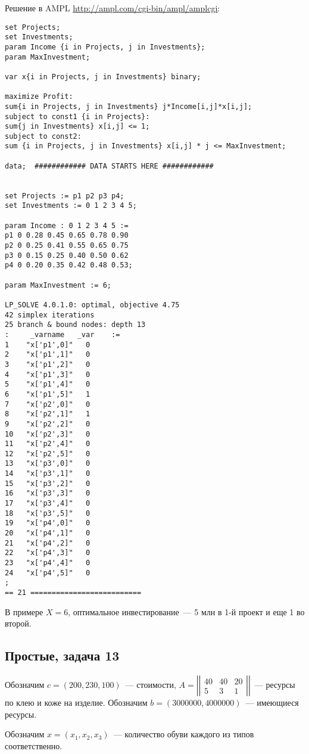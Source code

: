 \documentclass[a4paper]{article}
\newcommand{\matrixl}{\left|\left|}
\newcommand{\matrixr}{\right|\right|}
\begin{document}
Решение в AMPL \url{http://ampl.com/cgi-bin/ampl/amplcgi}:
\begin{verbatim}
set Projects;
set Investments;
param Income {i in Projects, j in Investments};
param MaxInvestment;

var x{i in Projects, j in Investments} binary;

maximize Profit:
sum{i in Projects, j in Investments} j*Income[i,j]*x[i,j];
subject to const1 {i in Projects}:
sum{j in Investments} x[i,j] <= 1;
subject to const2:
sum {i in Projects, j in Investments} x[i,j] * j <= MaxInvestment;

data;  ############ DATA STARTS HERE ############


set Projects := p1 p2 p3 p4;
set Investments := 0 1 2 3 4 5;

param Income : 0 1 2 3 4 5 :=
p1 0 0.28 0.45 0.65 0.78 0.90
p2 0 0.25 0.41 0.55 0.65 0.75
p3 0 0.15 0.25 0.40 0.50 0.62
p4 0 0.20 0.35 0.42 0.48 0.53;

param MaxInvestment := 6;

LP_SOLVE 4.0.1.0: optimal, objective 4.75
42 simplex iterations
25 branch & bound nodes: depth 13
:     _varname   _var    :=
1    "x['p1',0]"   0
2    "x['p1',1]"   0
3    "x['p1',2]"   0
4    "x['p1',3]"   0
5    "x['p1',4]"   0
6    "x['p1',5]"   1
7    "x['p2',0]"   0
8    "x['p2',1]"   1
9    "x['p2',2]"   0
10   "x['p2',3]"   0
11   "x['p2',4]"   0
12   "x['p2',5]"   0
13   "x['p3',0]"   0
14   "x['p3',1]"   0
15   "x['p3',2]"   0
16   "x['p3',3]"   0
17   "x['p3',4]"   0
18   "x['p3',5]"   0
19   "x['p4',0]"   0
20   "x['p4',1]"   0
21   "x['p4',2]"   0
22   "x['p4',3]"   0
23   "x['p4',4]"   0
24   "x['p4',5]"   0
;
== 21 ==========================

\end{verbatim}

В примере $X=6$, оптимальное инвестирование~--- 5 млн в 1-й проект и еще 1 во второй.

\subsection*{Простые, задача 13}
Обозначим $c=(200,230,100)$~--- стоимости, $A=\matrixl\begin{array}{ccc}
40 & 40 & 20\\
5 & 3 & 1
\end{array}
\matrixr$~--- ресурсы по клею и коже на изделие.
Обозначим $b=(3000000, 4000000)$~--- имеющиеся ресурсы.

Обозначим $x=(x_1, x_2, x_3)$~--- количество обуви каждого из типов соответственно.
\end{document}
